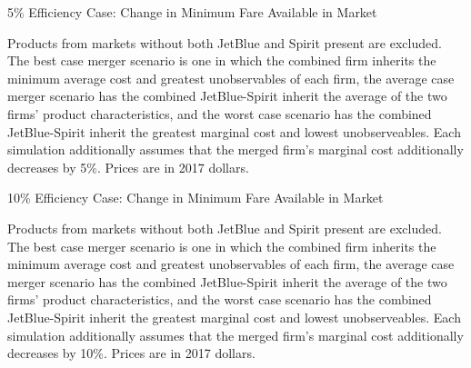 \documentclass{article}
\begin{document}
\begin{appendices}
    \begin{table}
        \caption{5\% Efficiency Case: Change in Minimum Fare Available in Market}
        \label{tab:MinimumPrice_5}
                \vspace{-15mm}
        \begin{center}
            
        \end{center}
        \vspace{-5mm}
        \footnotesize{Products from markets without both JetBlue and Spirit present are excluded. The best case merger scenario is one in which the combined firm inherits the minimum average cost and greatest unobservables of each firm, the average case merger scenario has the combined JetBlue-Spirit inherit the average of the two firms' product characteristics, and the worst case scenario has the combined JetBlue-Spirit inherit the greatest marginal cost and lowest unobserveables. Each simulation additionally assumes that the merged firm's marginal cost additionally decreases by 5\%. Prices are in 2017 dollars.}
    \end{table}   

   \begin{table}
        \caption{10\% Efficiency Case: Change in Minimum Fare Available in Market}
        \label{tab:MinimumPrice_10}
                \vspace{-15mm}
        \begin{center}
            
        \end{center}
        \vspace{-5mm}
        \footnotesize{Products from markets without both JetBlue and Spirit present are excluded. The best case merger scenario is one in which the combined firm inherits the minimum average cost and greatest unobservables of each firm, the average case merger scenario has the combined JetBlue-Spirit inherit the average of the two firms' product characteristics, and the worst case scenario has the combined JetBlue-Spirit inherit the greatest marginal cost and lowest unobserveables. Each simulation additionally assumes that the merged firm's marginal cost additionally decreases by 10\%. Prices are in 2017 dollars.}
    \end{table}  
    
    
\end{appendices}
	
\end{document}

